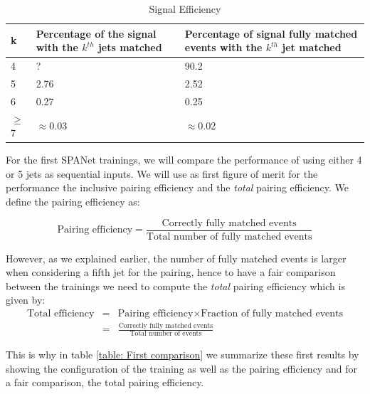 \begin{table}[h!]
\centering
\begin{tabular}{|p{1cm}||p{6cm}||p{6cm}|}
 \hline
 k  & Percentage of the signal with the $k^{th}$ jets matched & Percentage of signal fully matched events with the $k^{th}$ jet matched\\
 \hline
 4 &  ? & 90.2\\
 5 & 2.76 & 2.52 \\
 6 & 0.27 & 0.25 \\
 $\geq$7 &  $\approx$0.03 &  $\approx$0.02 \\
 \hline
\end{tabular}
\caption{Signal Efficiency}
\label{table:signal_efficiency}
\end{table}

For the first SPANet trainings, we will compare the performance of using either 4 or 5 jets as sequential inputs. We will use as first figure of merit for the performance the inclusive pairing efficiency and the \textit{total} pairing efficiency. We define the pairing efficiency as:

\begin{equation*}
    \text{Pairing efficiency}=\frac{\text{Correctly fully matched events}}{\text{Total number of fully matched events}}
\end{equation*}

However, as we explained earlier, the number of fully matched events is larger when considering a fifth jet for the pairing, hence to have a fair comparison between the trainings we need to compute the \textit{total} pairing efficiency which is given by:
\vspace{-0.2cm}
\begin{eqnarray*}
\text{Total efficiency} & = & \text{Pairing efficiency} \times \text{Fraction of fully matched events} \\
& = &\frac{\text{Correctly fully matched events}}{\text{Total number of events}}     
\end{eqnarray*}

This is why in table \ref{table: First comparison} we summarize these first results by showing the configuration of the training as well as the pairing efficiency and for a fair comparison, the total pairing efficiency.

